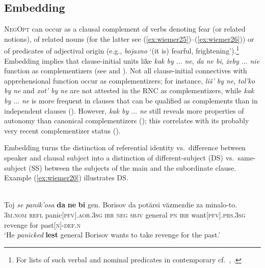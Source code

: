 \documentclass[output=paper,colorlinks,citecolor=brown]{langscibook}
\begin{document}
\subsection{Embedding}
\label{subsec:embedding}

\textsc{NegOpt} can occur as a clausal complement of verbs denoting fear (or related notions), of related nouns (for the latter see (\ref{ex:wiemer25})--(\ref{ex:wiemer26})) or of predicates of adjectival origin (e.g.,  \textit{bojazno} `(it is) fearful, frightening').\footnote{For lists of such verbal and nominal predicates in contemporary  cf.\ \citet[56]{Nilsson2012}, \citet[338]{Dobrushina2016}.} Embedding implies that clause-initial units like  \textit{kak by $\ldots$ ne},  \textit{da ne bi},  \textit{żeby $\ldots$  nie} function as complementizers (see  and ). Not all clause-initial connectives with apprehensional function occur as complementizers; for instance,  \textit{liš' by ne}, \textit{tol'ko by ne} and \textit{xot' by ne} are not attested in the RNC as complementizers, while \textit{kak by $\ldots$ ne} is more frequent in clauses that can be qualified as complements than in independent clauses (\citealt[335 and the Table on p. 330]{Dobrushina2016}). However, \textit{kak by $\ldots$  ne} still reveals more properties of autonomy than canonical complementizers (\citealt[345-346]{Dobrushina2016}); this correlates with its probably very recent complementizer status ().

Embedding turns the distinction of referential identity vs.\ difference between speaker and clausal subject into a distinction of different-subject (DS) vs.\ same-subject (SS) between the subjects of the main and the subordinate clause. Example (\ref{ex:wiemer20}) illustrates DS.


\ea
\label{ex:wiemer20} 
 \\
\gll Toj \textit{se} \textit{panik'osa} \textbf{da} \textbf{ne} \textbf{bi} gen. Borisov da potărsi văzmezdie za minalo-to. \\
\textsc{3m.nom} \textsc{refl} panic\textsc{[pfv].aor.3sg} \textsc{irr} \textsc{neg} \textsc{sbjv} general \textsc{pn} \textsc{irr} want\textsc{[pfv].prs.3sg} revenge for past\textsc{[n]-def.n} \\
\glt `He \textit{panicked} \textbf{lest} general Borisov wants to take revenge for the past.' \\
\z
\end{document}
